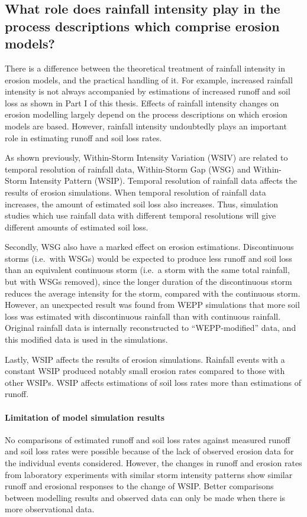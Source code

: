 \subsection{What role does rainfall intensity play in the process
descriptions which comprise erosion models?}
\label{sec:RainfallIntensityAndProcessDescriptions}
There is a difference between the theoretical treatment of rainfall intensity in
erosion models, and the practical handling of it. For example, increased
rainfall intensity is not always accompanied by estimations of increased runoff
and soil loss as shown in Part I of this thesis. Effects of rainfall intensity
changes on erosion modelling largely depend on the process descriptions on which
erosion models are based. However, rainfall intensity undoubtedly plays an
important role in estimating runoff and soil loss rates.

As shown previously, Within-Storm Intensity Variation (WSIV) are related to
temporal resolution of rainfall data, Within-Storm Gap (WSG) and Within-Storm
Intensity Pattern (WSIP). Temporal resolution of rainfall data affects the
results of erosion simulations. When temporal resolution of rainfall data
increases, the amount of estimated soil loss also increases. Thus, simulation
studies which use rainfall data with different temporal resolutions will give
different amounts of estimated soil loss.

Secondly, WSG also have a marked effect on erosion estimations. Discontinuous
storms (i.e.\ with WSGs) would be expected to produce less runoff and soil loss
than an equivalent continuous storm (i.e.\ a storm with the same total rainfall,
but with WSGs removed), since the longer duration of the discontinuous storm
reduces the average intensity for the storm, compared with the continuous storm.
However, an unexpected result was found from WEPP simulations that more soil
loss was estimated with discontinuous rainfall than with continuous rainfall.
Original rainfall data is internally reconstructed to ``WEPP-modified'' data,
and this modified data is used in the simulations.

Lastly, WSIP affects the results of erosion simulations. Rainfall events with a
constant WSIP produced notably small erosion rates compared to those with
other WSIPs. WSIP affects estimations of soil loss rates more than estimations
of runoff.

\paragraph{Limitation of model simulation results}
\label{sec:LimitationsStage1}
No comparisons of estimated runoff and soil loss rates against measured runoff
and soil loss rates were possible because of the lack of observed erosion data
for the individual events considered. However, the changes in runoff and erosion
rates from laboratory experiments with similar storm intensity patterns show
similar runoff and erosional responses to the change of WSIP. Better comparisons
between modelling results and observed data can only be made when there is
more observational data.

